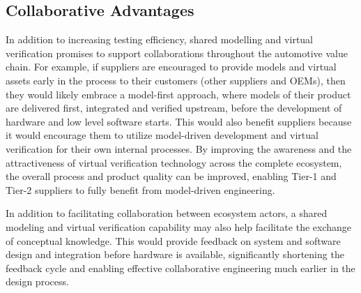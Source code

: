 \subsection{Collaborative Advantages}
In addition to increasing testing efficiency,
shared modelling and virtual verification promises to support collaborations throughout the automotive value chain.
%
%
For example, if suppliers are encouraged to provide models and virtual assets early in the process to their customers (other suppliers and OEMs),
then they would likely embrace a model-first approach,
where models of their product are delivered first, integrated and verified upstream, before the development of hardware and low level software starts.
This would also benefit suppliers because it would encourage them to utilize model-driven development and virtual verification for their own internal processes.
By improving the awareness and the attractiveness of virtual verification technology across the complete ecosystem, the overall process and product quality can be improved, enabling Tier-1 and Tier-2 suppliers to fully benefit from model-driven engineering.

In addition to facilitating collaboration between ecosystem actors, a shared modeling and virtual verification capability may also help facilitate the exchange of conceptual knowledge. This would provide feedback on system and software design and integration before hardware is available, significantly shortening the feedback cycle and enabling effective collaborative engineering much earlier in the design process.


